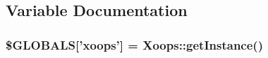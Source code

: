 \subsection{Variable Documentation}
\hypertarget{spoof_8php_ad10934112c0d18cf6b358d47afa6fcf1}{
\subsubsection[{\$\-G\-L\-O\-B\-A\-L\-S}]{\setlength{\rightskip}{0pt plus 5cm}\$G\-L\-O\-B\-A\-L\-S\mbox{[}'xoops'\mbox{]} = Xoops\-::get\-Instance()}}\label{spoof_8php_ad10934112c0d18cf6b358d47afa6fcf1}
